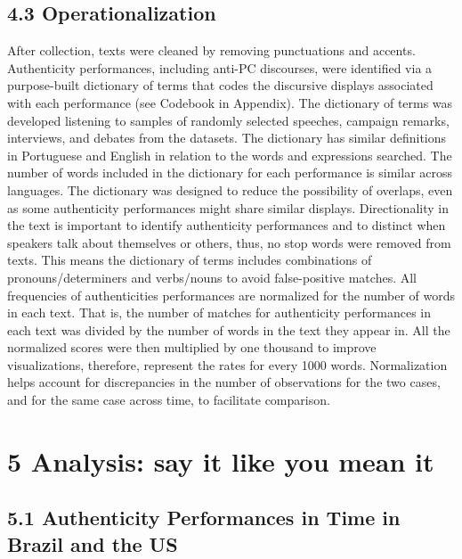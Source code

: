 \documentclass[
  12pt,
]{article}
\begin{document}
\hypertarget{operationalization}{%
\subsection{4.3 Operationalization}\label{operationalization}}

After collection, texts were cleaned by removing punctuations and
accents. Authenticity performances, including anti-PC discourses, were
identified via a purpose-built dictionary of terms that codes the
discursive displays associated with each performance (see Codebook in
Appendix). The dictionary of terms was developed listening to samples of
randomly selected speeches, campaign remarks, interviews, and debates
from the datasets. The dictionary has similar definitions in Portuguese
and English in relation to the words and expressions searched. The
number of words included in the dictionary for each performance is
similar across languages. The dictionary was designed to reduce the
possibility of overlaps, even as some authenticity performances might
share similar displays. Directionality in the text is important to
identify authenticity performances and to distinct when speakers talk
about themselves or others, thus, no stop words were removed from texts.
This means the dictionary of terms includes combinations of
pronouns/determiners and verbs/nouns to avoid false-positive matches.
All frequencies of authenticities performances are normalized for the
number of words in each text. That is, the number of matches for
authenticity performances in each text was divided by the number of
words in the text they appear in. All the normalized scores were then
multiplied by one thousand to improve visualizations, therefore,
represent the rates for every 1000 words. Normalization helps account
for discrepancies in the number of observations for the two cases, and
for the same case across time, to facilitate comparison.

\hypertarget{analysis-say-it-like-you-mean-it}{%
\section{5 Analysis: say it like you mean
it}\label{analysis-say-it-like-you-mean-it}}

\hypertarget{authenticity-performances-in-time-in-brazil-and-the-us}{%
\subsection{5.1 Authenticity Performances in Time in Brazil and the
US}\label{authenticity-performances-in-time-in-brazil-and-the-us}}
\end{document}
